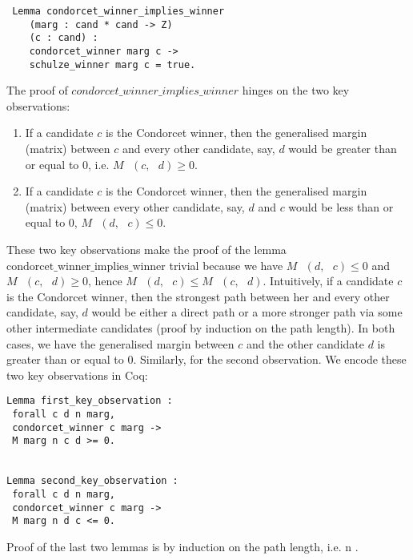 \documentclass[compsoc,conference,a4paper,10pt,times]{IEEEtran}
\begin{document}
\begin{verbatim}
 Lemma condorcet_winner_implies_winner 
    (marg : cand * cand -> Z)
    (c : cand) : 
    condorcet_winner marg c -> 
    schulze_winner marg c = true. 

\end{verbatim}

  		
 The proof of $condorcet\_winner\_implies\_winner$ hinges on the two key observations:
 
 \begin{enumerate}
  \item If a candidate $c$ is the Condorcet winner, then the generalised margin (matrix) 
  between $c$
  and every other candidate, say, $d$ would be greater than or equal to 0, i.e. 
  $M \text{ } (c, \text{ }d) \geq 0$.
  
  \item If a candidate $c$ is the Condorcet winner, then the generalised margin  (matrix)
  between every other candidate, say, $d$ and $c$ would be less than or equal to 0, 
  $M \text{ } (d, \text{ }c) \leq 0$.
 \end{enumerate}
 
 
 These two key observations make the proof of the lemma
 $\mathrm{condorcet\_winner\_implies\_winner}$  
 trivial because we have $M \text{ } (d, \text{ }c) \leq 0$  and
  $M \text{ } (c, \text{ }d) \geq 0$, hence $M \text{ } (d, \text{ }c)  \leq 
   M \text{ } (c, \text{ }d)$. Intuitively, 
 if a candidate $c$ is the Condorcet winner, then the strongest path between her and every other 
 candidate, say, $d$ would be either a direct path or a more stronger path 
 via some other intermediate candidates (proof by induction on the path length). 
 In both cases, we have the generalised margin between 
 $c$ and the other candidate $d$ is greater than or equal to 0. 
 Similarly, for the second observation. We encode these two key observations in 
 Coq:
 
 \begin{verbatim}
Lemma first_key_observation : 
 forall c d n marg, 
 condorcet_winner c marg -> 
 M marg n c d >= 0.


Lemma second_key_observation : 
 forall c d n marg, 
 condorcet_winner c marg -> 
 M marg n d c <= 0.

 \end{verbatim}

Proof of the last two lemmas is by induction on the path length, i.e. n \cite{Carre:1971:ANR}. 
\end{document}
